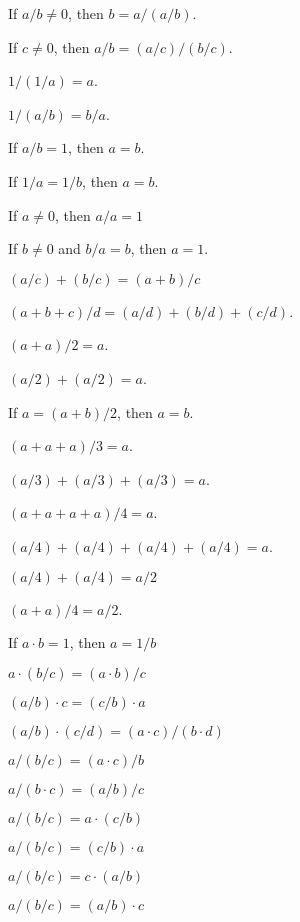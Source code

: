 \documentclass{article}
\begin{document}
\begin{thm}
\item\label{xcmplx1:54} If $a/b\neq0$, then $b=a/(a/b)$.
\item\label{xcmplx1:55} If $c\neq0$, then $a/b=(a/c)/(b/c)$.
  \bigbreak
\item\label{xcmplx1:56} $1/(1/a)=a$.
\item\label{xcmplx1:57} $1/(a/b)=b/a$.
\item\label{xcmplx1:58} If $a/b=1$, then $a=b$.
\item\label{xcmplx1:59} If $1/a=1/b$, then $a=b$.
  \bigbreak
\item\label{xcmplx1:60} If $a\neq0$, then $a/a=1$
\item\label{xcmplx1:61} If $b\neq0$ and $b/a=b$, then $a=1$.
  \bigbreak
\item\label{xcmplx1:62} $(a/c)+(b/c)=(a+b)/c$
\item\label{xcmplx1:63} $(a+b+c)/d=(a/d)+(b/d)+(c/d)$.
  \bigbreak
\item\label{xcmplx1:64} $(a+a)/2=a$.
\item\label{xcmplx1:65} $(a/2)+(a/2)=a$.
\item\label{xcmplx1:66} If $a=(a+b)/2$, then $a=b$.
  \bigbreak
\item\label{xcmplx1:67} $(a+a+a)/3=a$.
\item\label{xcmplx1:68} $(a/3)+(a/3)+(a/3)=a$.
  \bigbreak
\item\label{xcmplx1:69} $(a+a+a+a)/4=a$.
\item\label{xcmplx1:70} $(a/4)+(a/4)+(a/4)+(a/4)=a$.
\item\label{xcmplx1:71} $(a/4)+(a/4)=a/2$
\item\label{xcmplx1:72} $(a+a)/4=a/2$.
  \bigbreak
\item\label{xcmplx1:73} If $a\cdot b=1$, then $a=1/b$
\item\label{xcmplx1:74} $a\cdot(b/c)=(a\cdot b)/c$
\item\label{xcmplx1:75} $(a/b)\cdot c=(c/b)\cdot a$
  \bigbreak
\item\label{xcmplx1:76} $(a/b)\cdot(c/d)=(a\cdot c)/(b\cdot d)$
\item\label{xcmplx1:77} $a/(b/c)=(a\cdot c)/b$
\item\label{xcmplx1:78} $a/(b\cdot c)=(a/b)/c$
\item\label{xcmplx1:79} $a/(b/c)=a\cdot(c/b)$
\item\label{xcmplx1:80} $a/(b/c)=(c/b)\cdot a$
\item\label{xcmplx1:81} $a/(b/c)=c\cdot(a/b)$
\item\label{xcmplx1:82} $a/(b/c)=(a/b)\cdot c$

\end{thm}
\end{document}
